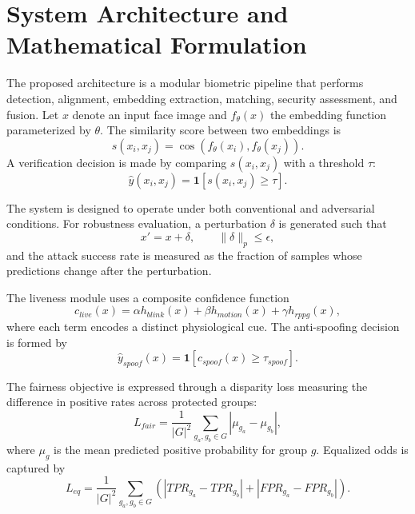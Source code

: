 \documentclass[conference]{IEEEtran}
\begin{document}
\section{System Architecture and Mathematical Formulation}
The proposed architecture is a modular biometric pipeline that performs detection, alignment, embedding extraction, matching, security assessment, and fusion. Let $x$ denote an input face image and $f_{\theta}(x)$ the embedding function parameterized by $\theta$. The similarity score between two embeddings is
\begin{equation}
 s(x_i,x_j)=\cos\left(f_{\theta}(x_i),f_{\theta}(x_j)\right).
\end{equation}
A verification decision is made by comparing $s(x_i,x_j)$ with a threshold $\tau$:
\begin{equation}
\hat{y}(x_i,x_j)=\mathbf{1}[s(x_i,x_j)\ge \tau].
\end{equation}

The system is designed to operate under both conventional and adversarial conditions. For robustness evaluation, a perturbation $\delta$ is generated such that
\begin{equation}
 x' = x + \delta, \qquad \|\delta\|_p \le \epsilon,
\end{equation}
 and the attack success rate is measured as the fraction of samples whose predictions change after the perturbation.

The liveness module uses a composite confidence function
\begin{equation}
 c_{live}(x)=\alpha h_{blink}(x)+\beta h_{motion}(x)+\gamma h_{rppg}(x),
\end{equation}
where each term encodes a distinct physiological cue. The anti-spoofing decision is formed by
\begin{equation}
\hat{y}_{spoof}(x)=\mathbf{1}[c_{spoof}(x)\ge \tau_{spoof}].
\end{equation}

The fairness objective is expressed through a disparity loss measuring the difference in positive rates across protected groups:
\begin{equation}
L_{fair}=\frac{1}{|G|^2}\sum_{g_a,g_b\in G}|\mu_{g_a}-\mu_{g_b}|,
\end{equation}
where $\mu_g$ is the mean predicted positive probability for group $g$. Equalized odds is captured by
\begin{equation}
L_{eq}=\frac{1}{|G|^2}\sum_{g_a,g_b\in G}\left(|TPR_{g_a}-TPR_{g_b}|+|FPR_{g_a}-FPR_{g_b}|\right).
\end{equation}
\end{document}
